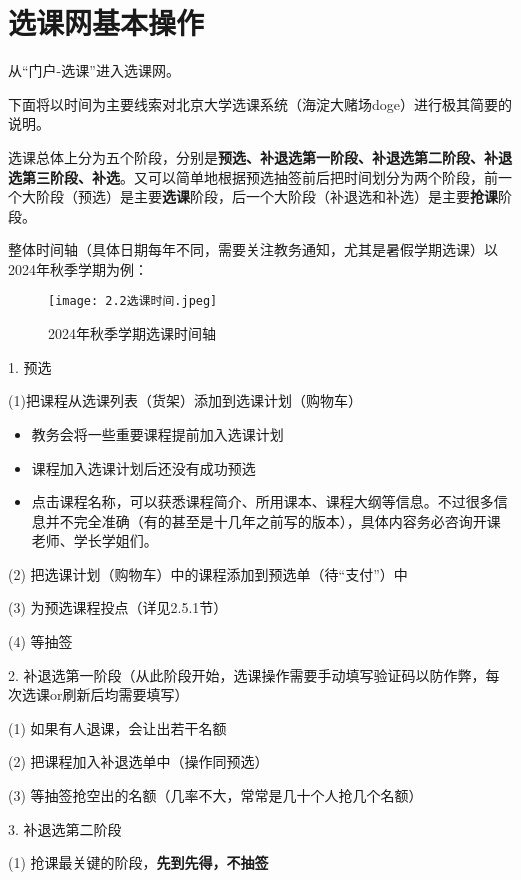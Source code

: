 \documentclass[11pt,oneside]{book}
\begin{document}
\newpage

\section{选课网基本操作}
从“门户-选课”进入选课网。

下面将以时间为主要线索对北京大学选课系统（海淀大赌场doge）进行极其简要的说明。

选课总体上分为五个阶段，分别是\textbf{\textbf{预选、补退选第一阶段、补退选第二阶段、补退选第三阶段、补选}}。又可以简单地根据预选抽签前后把时间划分为两个阶段，前一个大阶段（预选）是主要\textbf{\textbf{选课}}阶段，后一个大阶段（补退选和补选）是主要\textbf{\textbf{抢课}}阶段。

整体时间轴（具体日期每年不同，需要关注教务通知，尤其是暑假学期选课）以2024年秋季学期为例：
\begin{figure}[htbp]
    \centering
    \texttt{[image: 2.2选课时间.jpeg]}
    \renewcommand{\figurename}{图}
    \caption{2024年秋季学期选课时间轴}
    \label{fig:enter-label}
\end{figure}

1. 预选

(1)把课程从选课列表（货架）添加到选课计划（购物车）

\begin{itemize}
    \item  教务会将一些重要课程提前加入选课计划
    \item 课程加入选课计划后还没有成功预选
    \item 点击课程名称，可以获悉课程简介、所用课本、课程大纲等信息。不过很多信息并不完全准确（有的甚至是十几年之前写的版本），具体内容务必咨询开课老师、学长学姐们。
\end{itemize}

(2) 把选课计划（购物车）中的课程添加到预选单（待“支付”）中

(3) 为预选课程投点（详见2.5.1节）

(4) 等抽签

2. 补退选第一阶段（从此阶段开始，选课操作需要手动填写验证码以防作弊，每次选课or刷新后均需要填写）

(1) 如果有人退课，会让出若干名额

(2) 把课程加入补退选单中（操作同预选）

(3) 等抽签抢空出的名额（几率不大，常常是几十个人抢几个名额）

3. 补退选第二阶段

(1) 抢课最关键的阶段，\textbf{\textbf{先到先得，不抽签}}
\end{document}
